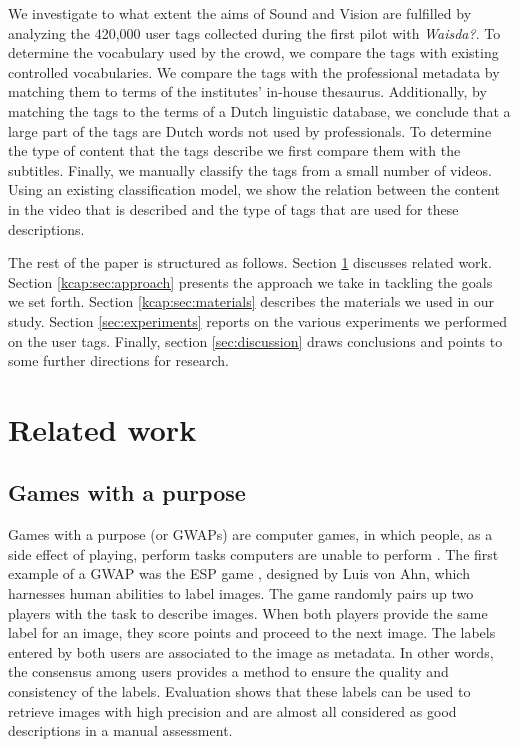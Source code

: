 We investigate to what extent the aims of Sound and Vision are fulfilled by
analyzing the 420,000 user tags collected during the first pilot with
\emph{Waisda?}. To determine the vocabulary used by the crowd, we compare the
tags with existing controlled vocabularies. We compare the tags with the
professional metadata by matching them to terms of the institutes' in-house
thesaurus. Additionally, by matching the tags to the terms of a Dutch
linguistic database, we conclude that a large part of the tags are Dutch words
not used by professionals. To determine the type of content that the tags
describe we first compare them with the subtitles. Finally, we manually
classify the tags from a small number of videos. Using an existing
classification model, we show the relation between the content in the video
that is described and the type of tags that are used for these descriptions.

The rest of the paper is structured as follows. Section \ref{sec:related_work}
discusses related work. Section \ref{kcap:sec:approach} presents the approach we
take in tackling the goals we set forth. Section \ref{kcap:sec:materials} describes
the materials we used in our study. Section \ref{sec:experiments} reports on
the various experiments we performed on the user tags. Finally, section
\ref{sec:discussion} draws conclusions and points to some further directions
for research.

\newpage

\section{Related work}
\label{sec:related_work}

\subsection{Games with a purpose}

Games with a purpose (or GWAPs) are computer games, in which people, as a side
effect of playing, perform tasks computers are unable to perform \cite{gwap}.
The first example of a GWAP was the ESP game \cite{CHI2004:vonAhn}, designed
by Luis von Ahn, which harnesses human abilities to label images. The game
randomly pairs up two players with the task to describe images. When both
players provide the same label for an image, they score points and proceed to
the next image. The labels entered by both users are associated to the image
as metadata. In other words, the consensus among users provides a method to
ensure the quality and consistency of the labels. Evaluation shows that these
labels can be used to retrieve images with high precision and are almost all
considered as good descriptions in a manual assessment.

